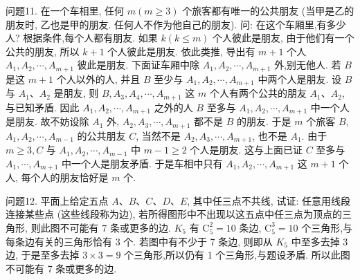 问题11. 在一个车相里, 任何 $m(m \geqslant 3)$ 个旅客都有唯一的公共朋友 (当甲是乙的朋友时, 乙也是甲的朋友.
任何人不作为他自己的朋友). 问: 在这个车厢里,有多少人?
根据条件,每个人都有朋友.
如果 $k(k \leqslant m)$ 个人彼此是朋友, 由于他们有一个公共的朋友, 所以 $k+1$ 个人彼此是朋友.
依此类推, 导出有 $m+1$ 个人 $A_1, A_2, \cdots, A_{m+1}$ 彼此是朋友.
下面证车厢中除 $A_1, A_2, \cdots, A_{m+1}$ 外,别无他人.
若 $B$ 是这 $m+1$ 个人以外的人, 并且 $B$ 至少与 $A_1, A_2, \cdots, A_{m+1}$ 中两个人是朋友.
设 $B$ 与 $A_1 、 A_2$ 是朋友, 则 $B, A_3, A_4, \cdots, A_{m+1}$ 这 $m$ 个人有两个公共的朋友 $A_1 、 A_2$, 与已知矛盾.
因此 $A_1, A_2, \cdots, A_{m+1}$ 之外的人 $B$ 至多与 $A_1, A_2, \cdots, A_{m+1}$ 中一个人是朋友.
故不妨设除 $A_1$ 外, $A_2, A_3, \cdots, A_{m+1}$ 都不是 $B$ 的朋友.
于是 $m$ 个旅客 $B$, $A_1, A_2, \cdots, A_{m-1}$ 的公共朋友 $C$, 当然不是 $A_2, A_3, \cdots, A_{m+1}$, 也不是 $A_1$. 由于
$m \geqslant 3, C$ 与 $A_1, A_2, \cdots, A_{m-1}$ 中 $m-1 \geqslant 2$ 个人是朋友.
这与上面已证 $C$ 至多与 $A_1, \cdots, A_{m+1}$ 中一个人是朋友矛盾.
于是车相中只有 $A_1, A_2, \cdots, A_{m+1}$ 这 $m+1$ 个人, 每个人的朋友恰好是 $m$ 个.



问题12. 平面上给定五点 $A 、 B 、 C 、 D 、 E$, 其中任三点不共线, 试证: 任意用线段连接某些点 (这些线段称为边), 若所得图形中不出现以这五点中任三点为顶点的三角形, 则此图不可能有 7 条或更多的边.
$K_5$ 有 $\mathrm{C}_5^2=10$ 条边, $\mathrm{C}_5^3=10$ 个三角形,与每条边有关的三角形恰有 3 个.
若图中有不少于 7 条边, 则即从 $K_5$ 中至多去掉 3 边, 于是至多去掉 $3 \times 3=9$ 个三角形,所以仍有 1 个三角形,与题设矛盾.
所以此图不可能有 7 条或更多的边.


